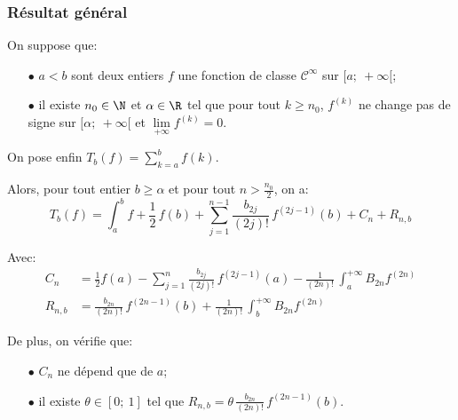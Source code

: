 \subsubsection{Résultat général}

\begin{theo}
On suppose que:
\begin{itemize}
\item[$\bullet$] 
$a<b$ sont deux entiers $f$ une fonction de classe $\mathcal{C}^{\infty}$ sur $[a;~+\infty[$;
\item[$\bullet$] 
il existe $n_0 \in \N$ et $\alpha \in \R$ tel que pour tout $k \geq n_0$, $f^{(k)}$ ne change pas de signe sur $[\alpha;~+\infty[$ et $\lim \limits_{+\infty} f^{(k)} = 0$.
\end{itemize}

On pose enfin $T_b(f) = \displaystyle{\sum_{k=a}^b} f(k)$. 

\medskip
Alors, pour tout entier $b \geq \alpha$ et pour tout $n > \frac{n_0}{2}$, on a:
\begin{equation}
\label{approximation_asymptotique}
T_b(f) = \displaystyle{\int_a^{b}} f + \frac{1}{2} \, f(b) + \displaystyle{\sum_{j=1}^{n-1}} \frac{b_{2j}}{(2j)!} \, f^{(2j-1)}(b) + C_n + R_{n,b}
\end{equation}

Avec:
\begin{align*}
C_n & = \frac{1}{2} f(a) - \displaystyle{\sum_{j=1}^{n}} \frac{b_{2j}}{(2j)!} \, f^{(2j-1)}(a) - \frac{1}{(2n)!} \, \displaystyle{\int_a^{+\infty}} B_{2n} f^{(2n)}\\
R_{n,b} & = \frac{b_{2n}}{(2n)!} \, f^{(2n-1)}(b) + \frac{1}{(2n)!} \, \displaystyle{\int_b^{+\infty}} B_{2n} f^{(2n)}
\end{align*}

De plus, on vérifie que:
\begin{itemize}
\item[$\bullet$] 
$C_n$ ne dépend que de $a$;
\item[$\bullet$] 
il existe $\theta \in [0;~1]$ tel que $R_{n,b} = \theta \, \frac{b_{2n}}{(2n)!} \, f^{(2n-1)}(b)$.
\end{itemize}
\end{theo}


